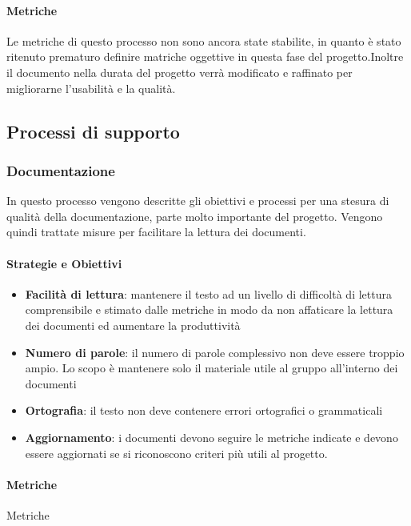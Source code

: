         \paragraph{Metriche}
        Le metriche di questo processo non sono ancora state stabilite, in quanto è stato ritenuto prematuro definire matriche oggettive in questa fase del progetto.Inoltre il documento nella durata del progetto verrà modificato e raffinato per migliorarne l'usabilità e la qualità.
        
        
        
        \subsection{Processi di supporto}
            \subsubsection{Documentazione}
            In questo processo vengono descritte gli obiettivi e processi per una stesura di qualità della documentazione, parte molto importante del progetto. Vengono quindi trattate misure per facilitare la lettura dei documenti.
            
            \paragraph{Strategie e Obiettivi}
            \begin{itemize}
                \item \textbf{Facilità di lettura}: mantenere il testo ad un livello di difficoltà di lettura comprensibile e stimato dalle metriche in modo da non affaticare la lettura dei documenti ed aumentare la produttività
                \item \textbf{Numero di parole}: il numero di parole complessivo non deve essere troppio ampio. Lo scopo è mantenere solo il materiale utile al gruppo all'interno dei documenti
                \item \textbf{Ortografia}: il testo non deve contenere errori ortografici o grammaticali
                \item \textbf{Aggiornamento}: i documenti devono seguire le metriche indicate e devono essere aggiornati se si riconoscono criteri più utili al progetto.
            \end{itemize}
            
            \paragraph{Metriche}
            Metriche
            

